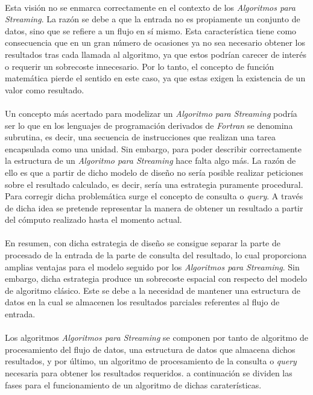 \documentclass{subfiles}
\begin{document}
      \paragraph{}
      Esta visión no se enmarca correctamente en el contexto de los \emph{Algoritmos para Streaming}. La razón se debe a que la entrada no es propiamente un conjunto de datos, sino que se refiere a un flujo en sí mismo. Esta característica tiene como consecuencia que en un gran número de ocasiones ya no sea necesario obtener los resultados tras cada llamada al algoritmo, ya que estos podrían carecer de interés o requerir un sobrecoste innecesario. Por lo tanto, el concepto de función matemática pierde el sentido en este caso, ya que estas exigen la existencia de un valor como resultado.

      \paragraph{}
      Un concepto más acertado para modelizar un \emph{Algoritmo para Streaming} podría ser lo que en los lenguajes de programación derivados de \emph{Fortran} se denomina subrutina, es decir, una secuencia de instrucciones que realizan una tarea encapsulada como una unidad. Sin embargo, para poder describir correctamente la estructura de un \emph{Algoritmo para Streaming} hace falta algo más. La razón de ello es que a partir de dicho modelo de diseño no sería posible realizar peticiones sobre el resultado calculado, es decir, sería una estrategia puramente procedural. Para corregir dicha problemática surge el concepto de consulta o \emph{query}. A través de dicha idea se pretende representar la manera de obtener un resultado a partir del cómputo realizado hasta el momento actual.

      \paragraph{}
      En resumen, con dicha estrategia de diseño se consigue separar la parte de procesado de la entrada de la parte de consulta del resultado, lo cual proporciona amplias ventajas para el modelo seguido por los \emph{Algoritmos para Streaming}. Sin embargo, dicha estrategia produce un sobrecoste espacial con respecto del modelo de algoritmo clásico. Este se debe a la necesidad de mantener una estructura de datos en la cual se almacenen los resultados parciales referentes al flujo de entrada.

      \paragraph{}
      Los algoritmos \emph{Algoritmos para Streaming} se componen por tanto de algoritmo de procesamiento del flujo de datos, una estructura de datos que almacena dichos resultados, y por último, un algoritmo de procesamiento de la consulta o \emph{query} necesaria para obtener los resultados requeridos. a continuación se dividen las fases para el funcionamiento de un algoritmo de dichas caraterísticas.
\end{document}
